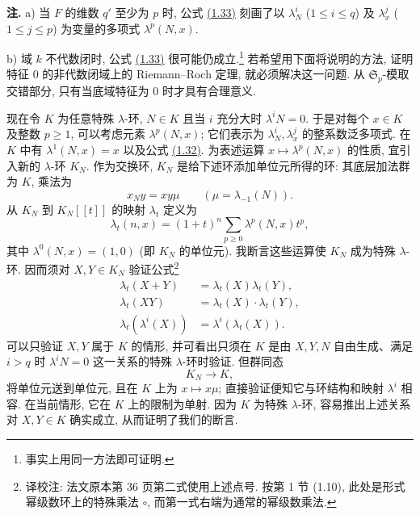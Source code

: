 \textbf{注.} a) 当 $F$ 的维数 $q'$ 至少为 $p$ 时, 公式 \hyperlink{sga6.e00.eq.1-33}{(1.33)} 刻画了以 $\lambda_N^i$ ($1\leq i\leq q$) 及 $\lambda_x^j$ ($1\leq j\leq p$) 为变量的多项式 $\lambda^p(N,x)$.

b) 域 $k$ 不代数闭时, 公式 \hyperlink{sga6.e00.eq.1-33}{(1.33)} 很可能仍成立.\footnote{事实上用同一方法即可证明.} 若希望用下面将说明的方法, 证明特征 $0$ 的非代数闭域上的 Riemann--Roch 定理, 就必须解决这一问题. 从 $\mathfrak S_p$-模取交错部分, 只有当底域特征为 $0$ 时才具有合理意义.

现在令 $K$ 为任意特殊 $\lambda$-环, $N\in K$ 且当 $i$ 充分大时 $\lambda^iN=0$. 于是对每个 $x\in K$ 及整数 $p\geq1$, 可以考虑元素 $\lambda^p(N,x)$; 它们表示为 $\lambda_N^i,\lambda_x^j$ 的整系数泛多项式. 在 $K$ 中有 $\lambda^1(N,x)=x$ 以及公式 \hyperlink{sga6.e00.eq.1-32}{(1.32)}. 为表述运算 $x\mapsto\lambda^p(N,x)$ 的性质, 宜引入新的 $\lambda$-环 $K_N$. 作为交换环, $K_N$ 是给下述环添加单位元所得的环: 其底层加法群为 $K$, 乘法为
\begin{equation}\tag{1.34}
x_Ny=xy\mu\qquad(\mu=\lambda_{-1}(N)).
\end{equation}
从 $K_N$ 到 $K_N[[t]]$ 的映射 $\lambda_t$ 定义为
\begin{equation}\tag{1.35}
\lambda_t(n,x)=(1+t)^n\sum_{p\geq 0}\lambda^p(N,x)t^p,
\end{equation}
其中 $\lambda^0(N,x)=(1,0)$ (即 $K_N$ 的单位元). 我断言这些运算使 $K_N$ 成为特殊 $\lambda$-环. 因而须对 $X,Y\in K_N$ 验证公式\footnote{译校注: 法文原本第 36 页第二式使用上述点号. 按第 1 节 (1.10), 此处是形式幂级数环上的特殊乘法 $\circ$, 而第一式右端为通常的幂级数乘法.}
\[
\begin{aligned}
\lambda_t(X+Y)&=\lambda_t(X)\lambda_t(Y),\\
\lambda_t(XY)&=\lambda_t(X)\cdot\lambda_t(Y),\\
\lambda_t(\lambda^i(X))&=\lambda^i(\lambda_t(X)).
\end{aligned}
\]
可以只验证 $X,Y$ 属于 $K$ 的情形, 并可看出只须在 $K$ 是由 $X,Y,N$ 自由生成、满足 $i>q$ 时 $\lambda^iN=0$ 这一关系的特殊 $\lambda$-环时验证. 但群同态
\begin{equation}\tag{1.36}
K_N\longrightarrow K,
\end{equation}
将单位元送到单位元, 且在 $K$ 上为 $x\mapsto x\mu$; 直接验证便知它与环结构和映射 $\lambda^i$ 相容. 在当前情形, 它在 $K$ 上的限制为单射. 因为 $K$ 为特殊 $\lambda$-环, 容易推出上述关系对 $X,Y\in K$ 确实成立, 从而证明了我们的断言.

